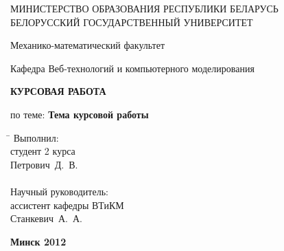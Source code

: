 \begin{titlepage}

\begin{center} 
 МИНИСТЕРСТВО ОБРАЗОВАНИЯ РЕСПУБЛИКИ БЕЛАРУСЬ\\
{БЕЛОРУССКИЙ ГОСУДАРСТВЕННЫЙ УНИВЕРСИТЕТ}

{Механико-математический факультет}

{Кафедра Веб-технологий и компьютерного моделирования}
\end{center}
\medskip

\vspace{5cm}

\begin{center}
{\bfseries КУРСОВАЯ РАБОТА}\\ \vspace{0.3cm}

по теме: {\bfseries Тема курсовой работы}\\


\end{center}
\vspace{7cm}

\begin{tabbing}
\hspace{9cm} \= \kill \>
Выполнил: \+ \\
студент 2 курса\\
Петрович~Д.~В.\\
\\
Научный руководитель:  \\
ассистент кафедры ВТиКМ\\
Станкевич~А.~А.
\end{tabbing}
\vspace{4cm}

\begin{center}
 \bfseries Минск 2012
\end{center}

\end{titlepage}